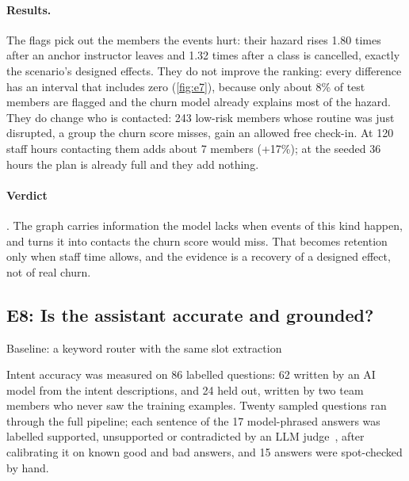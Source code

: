 \documentclass[paper=a4, fontsize=11pt, open=any, parskip=half-,
  headings=small, numbers=noenddot, captions=tableheading, toc=flat]{scrreprt}
\begin{document}
\paragraph{Results.} The flags pick out the members the events hurt: their hazard rises 1.80 times after an anchor instructor leaves and 1.32 times after a class is cancelled, exactly the scenario's designed effects. They do not improve the ranking: every difference has an interval that includes zero (\cref{fig:e7}), because only about 8\% of test members are flagged and the churn model already explains most of the hazard. They do change who is contacted: 243 low-risk members whose routine was just disrupted, a group the churn score misses, gain an allowed free check-in. At 120 staff hours contacting them adds about 7 members (+17\%); at the seeded 36 hours the plan is already full and they add nothing.

\paragraph{Verdict} . The graph carries information the model lacks when events of this kind happen, and turns it into contacts the churn score would miss. That becomes retention only when staff time allows, and the evidence is a recovery of a designed effect, not of real churn.

\subsection{E8: Is the assistant accurate and grounded?}
\label{sec:e8}
\quad\textsf{\small Baseline: a keyword router with the same slot extraction}

Intent accuracy was measured on 86 labelled questions: 62 written by an AI model from the intent descriptions, and 24 held out, written by two team members who never saw the training examples. Twenty sampled questions ran through the full pipeline; each sentence of the 17 model-phrased answers was labelled supported, unsupported or contradicted by an LLM judge~\cite{zheng2023judge}, after calibrating it on known good and bad answers, and 15 answers were spot-checked by hand.
\end{document}
